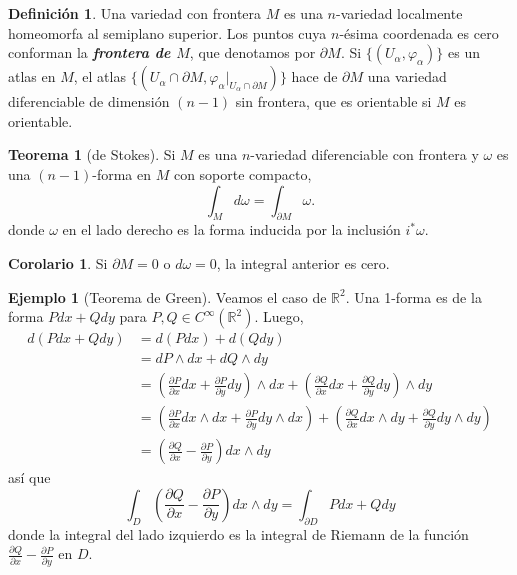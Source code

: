 \documentclass[spanish]{article}
\theoremstyle{definition}
\newtheorem*{defn}{Definición}
\newtheorem*{teo}{Teorema}
\newtheorem*{coro}{Corolario}
\newtheorem*{ejem}{Ejemplo}
\newcommand{\R}{\mathbb{R}}
\newcommand{\Cinf}{C^\infty}
\begin{document}
	\begin{defn}
		Una variedad con frontera $M$ es una $n$-variedad localmente homeomorfa al semiplano superior. Los puntos cuya $n$-ésima coordenada es cero conforman la \textbf{\textit{frontera de $M$}}, que denotamos por $\partial M$. Si $\{(U_\alpha,\varphi_\alpha)\}$ es un atlas en $M$, el atlas $\{(U_\alpha\cap\partial M,\varphi_{\alpha}|_{U_\alpha\cap\partial M})\}$ hace de $\partial M$ una variedad diferenciable de dimensión $(n-1)$ sin frontera, que es orientable si $M$ es orientable.
	\end{defn}
	
	\begin{teo}[de Stokes]
		Si $M$ es una $n$-variedad diferenciable con frontera y $\omega$ es una $(n-1)$-forma en $M$ con soporte compacto,
		\[\int_{M}d\omega=\int_{\partial M}\omega.\]
		donde $\omega$ en el lado derecho es la forma inducida por la inclusión $i^*\omega$.
	\end{teo}
	\begin{coro}
		Si $\partial M=0$ o $d\omega=0$, la integral anterior es cero.
	\end{coro}
	\iffalse
	\begin{ejem}[Teorema de Green]
		Veamos el caso de $\R^2$. Una 1-forma es de la forma $Pdx+Qdy$ para $P,Q\in\Cinf(\R^2)$. Luego,
		\begin{align*}
			d(Pdx+Qdy)&=d(Pdx)+d(Qdy)\\
			&=dP\wedge dx+dQ\wedge dy\\
			&=\left(\frac{\partial P}{\partial x}dx+\frac{\partial P}{\partial y}dy\right)\wedge dx+\left(\frac{\partial Q}{\partial x}dx+\frac{\partial Q}{\partial y}dy\right)\wedge dy\\
			&=\left(\frac{\partial P}{\partial x}dx\wedge dx+\frac{\partial P}{\partial y}dy\wedge dx\right)+\left(\frac{\partial Q}{\partial x}dx\wedge dy+\frac{\partial Q}{\partial y}dy\wedge dy\right)\\
			&=\left(\frac{\partial Q}{\partial x}-\frac{\partial P}{\partial y}\right)dx\wedge dy
		\end{align*}
		así que
		\[\int_{D}\left(\frac{\partial Q}{\partial x}-\frac{\partial P}{\partial y}\right)dx\wedge dy=\int_{\partial D}Pdx+Qdy\]
		donde la integral del lado izquierdo es la integral de Riemann de la función $\frac{\partial Q}{\partial x}-\frac{\partial P}{\partial y}$ en $D$.
	\end{ejem}
\end{document}
